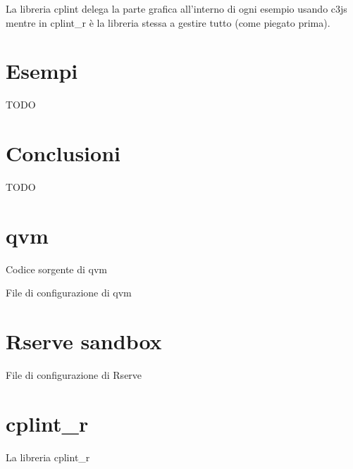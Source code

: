 \documentclass[10pt,titlepage,twoside,a4paper]{report}
\newenvironment{code}{\singlespacing\captionsetup{type=listing}}{}
\begin{document}
La libreria cplint delega la parte grafica all'interno di ogni esempio usando 
c3js mentre in cplint\_r è la libreria stessa a gestire tutto (come piegato 
prima).




\chapter{Esempi}

TODO



\chapter{Conclusioni}

TODO



\appendix

\chapter{qvm} \label{app:qvm}

    \begin{code}
        \caption{Codice sorgente di qvm}
    \end{code}

    \newpage

    \begin{code}
        \caption{File di configurazione di qvm}
    \end{code}




\chapter{Rserve sandbox} \label{app:rserve-sandbox}
    \begin{code}
        \caption{File di configurazione di Rserve}
    \end{code}

\chapter{cplint\_r} \label{app:cplint-r}
    \begin{code}
        \caption{La libreria cplint\_r}
    \end{code}






\end{document}
